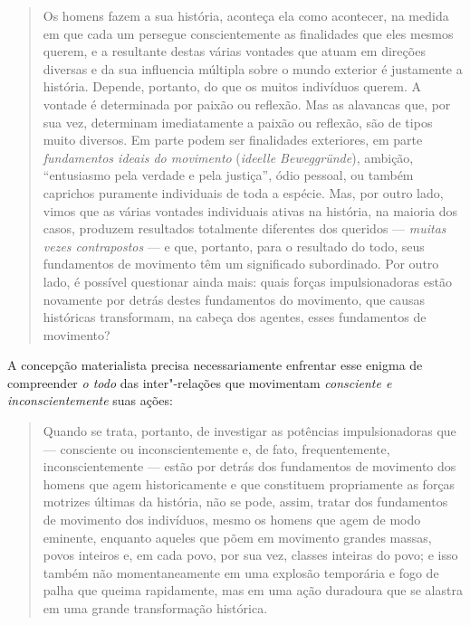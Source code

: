 \begin{quote}
Os homens fazem a sua história, aconteça ela como acontecer, na medida
em que cada um persegue conscientemente as finalidades que eles mesmos
querem, e a resultante destas várias vontades que atuam em direções
diversas e da sua influencia múltipla sobre o mundo exterior é
justamente a história. Depende, portanto, do que os muitos indivíduos
querem. A vontade é determinada por paixão ou reflexão. Mas as alavancas
que, por sua vez, determinam imediatamente a paixão ou reflexão, são de
tipos muito diversos. Em parte podem ser finalidades exteriores, em
parte \emph{fundamentos ideais do movimento} (\emph{ideelle
Beweggründe}), ambição, ``entusiasmo pela verdade e pela justiça'', ódio
pessoal, ou também caprichos puramente individuais de toda a espécie.
Mas, por outro lado, vimos que as várias vontades individuais ativas na
história, na maioria dos casos, produzem resultados totalmente
diferentes dos queridos --- \emph{muitas vezes contrapostos} --- e que, %
portanto, para o resultado do todo, seus fundamentos de movimento têm um
significado subordinado. Por outro lado, é possível questionar ainda
mais: quais forças impulsionadoras estão novamente por detrás destes
fundamentos do movimento, que causas históricas transformam, na cabeça
dos agentes, esses fundamentos de movimento?
\end{quote}

A concepção materialista precisa necessariamente enfrentar esse enigma
de compreender \emph{o todo} das inter"-relações que movimentam
\emph{consciente e inconscientemente} suas ações:

\begin{quote}
Quando se trata, portanto, de investigar as potências impulsionadoras
que --- consciente ou inconscientemente e, de fato, frequentemente,
inconscientemente --- estão por detrás dos fundamentos de movimento dos
homens que agem historicamente e que constituem propriamente as forças
motrizes últimas da história, não se pode, assim, tratar dos fundamentos
de movimento dos indivíduos, mesmo os homens que agem de modo eminente,
enquanto aqueles que põem em movimento grandes massas, povos inteiros e,
em cada povo, por sua vez, classes inteiras do povo; e isso também não
momentaneamente em uma explosão temporária e fogo de palha que queima
rapidamente, mas em uma ação duradoura que se alastra em uma grande
transformação histórica.
\end{quote}


